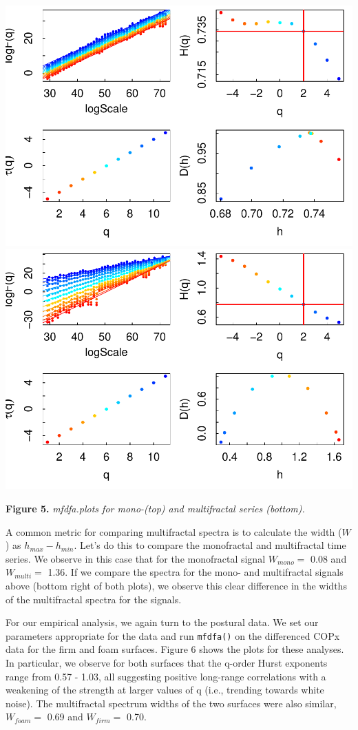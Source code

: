 \documentclass[
  man]{apa6}
\begin{document}
\includegraphics{fractal_regression_paper_brm_files/figure-latex/unnamed-chunk-11-1.pdf} \includegraphics{fractal_regression_paper_brm_files/figure-latex/unnamed-chunk-11-2.pdf}

\textbf{Figure 5.} \emph{mfdfa.plots for mono-(top) and multifractal series
(bottom).}

A common metric for comparing multifractal spectra is to calculate the
width (\(W\)) as \(h_{max} - h_{min}\). Let's do this to compare the
monofractal and multifractal time series. We observe in this case that
for the monofractal signal \(W_{mono} =\)
0.08 and \(W_{multi} =\)
1.36. If we compare the
spectra for the mono- and multifractal signals above (bottom right of
both plots), we observe this clear difference in the widths of the
multifractal spectra for the signals.

For our empirical analysis, we again turn to the postural data. We set
our parameters appropriate for the data and run \texttt{mfdfa()} on the
differenced COPx data for the firm and foam surfaces. Figure 6 shows the
plots for these analyses. In particular, we observe for both surfaces
that the q-order Hurst exponents range from
0.57 -
1.03,
all suggesting positive long-range correlations with a weakening of the
strength at larger values of q (i.e., trending towards white noise). The
multifractal spectrum widths of the two surfaces were also similar,
\(W_{foam} =\)
0.69
and \(W_{firm} =\)
0.70.
\end{document}
